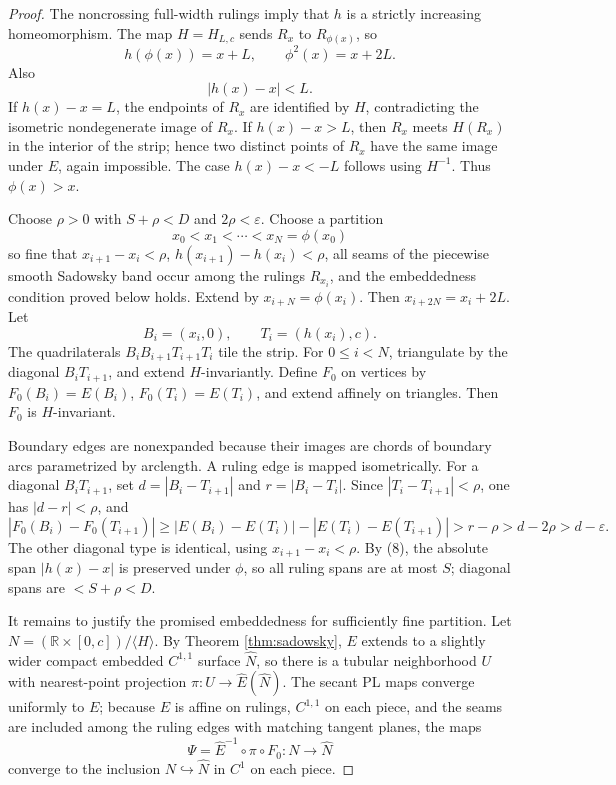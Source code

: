 \documentclass[12pt]{article}
\newcommand{\R}{\mathbb R}
\theoremstyle{plain}
\begin{document}
\begin{proof}
The noncrossing full-width rulings imply that \(h\) is a strictly increasing
homeomorphism.  The map \(H=H_{L,c}\) sends \(R_x\) to
\(R_{\phi(x)}\), so
\[
h(\phi(x))=x+L,\qquad \phi^2(x)=x+2L. \tag{8}
\]
Also
\[
|h(x)-x|<L. \tag{9}
\]
If \(h(x)-x=L\), the endpoints of \(R_x\) are identified by \(H\), contradicting
the isometric nondegenerate image of \(R_x\).  If \(h(x)-x>L\), then \(R_x\)
meets \(H(R_x)\) in the interior of the strip; hence two distinct points of
\(R_x\) have the same image under \(E\), again impossible.  The case
\(h(x)-x<-L\) follows using \(H^{-1}\).  Thus \(\phi(x)>x\).

Choose \(\rho>0\) with \(S+\rho<D\) and \(2\rho<\varepsilon\).  Choose a
partition
\[
x_0<x_1<\cdots<x_N=\phi(x_0)
\]
so fine that \(x_{i+1}-x_i<\rho\), \(h(x_{i+1})-h(x_i)<\rho\), all seams of the
piecewise smooth Sadowsky band occur among the rulings \(R_{x_i}\), and the
embeddedness condition proved below holds.  Extend by \(x_{i+N}=\phi(x_i)\).
Then \(x_{i+2N}=x_i+2L\).  Let
\[
B_i=(x_i,0),\qquad T_i=(h(x_i),c).
\]
The quadrilaterals \(B_iB_{i+1}T_{i+1}T_i\) tile the strip.  For
\(0\le i<N\), triangulate by the diagonal \(B_iT_{i+1}\), and extend
\(H\)-invariantly.  Define \(F_0\) on vertices by \(F_0(B_i)=E(B_i)\),
\(F_0(T_i)=E(T_i)\), and extend affinely on triangles.  Then \(F_0\) is
\(H\)-invariant.

Boundary edges are nonexpanded because their images are chords of boundary
arcs parametrized by arclength.  A ruling edge is mapped isometrically.  For a
diagonal \(B_iT_{i+1}\), set
\(d=|B_i-T_{i+1}|\) and \(r=|B_i-T_i|\).  Since
\(|T_i-T_{i+1}|<\rho\), one has \(|d-r|<\rho\), and
\[
|F_0(B_i)-F_0(T_{i+1})|
\ge |E(B_i)-E(T_i)|-|E(T_i)-E(T_{i+1})|
>r-\rho>d-2\rho>d-\varepsilon.
\]
The other diagonal type is identical, using \(x_{i+1}-x_i<\rho\).  By (8),
the absolute span \(|h(x)-x|\) is preserved under \(\phi\), so all ruling spans
are at most \(S\); diagonal spans are \(<S+\rho<D\).

It remains to justify the promised embeddedness for sufficiently fine
partition.  Let
\(N=(\R\times[0,c])/\langle H\rangle\).  By Theorem \ref{thm:sadowsky}, \(E\)
extends to a slightly wider compact embedded \(C^{1,1}\) surface
\(\widehat N\), so there is a tubular neighborhood \(U\) with nearest-point
projection \(\pi:U\to \widehat E(\widehat N)\).  The secant PL maps converge
uniformly to \(E\); because \(E\) is affine on rulings, \(C^{1,1}\) on each
piece, and the seams are included among the ruling edges with matching tangent
planes, the maps
\[
\Psi=\widehat E^{-1}\circ\pi\circ F_0:N\to\widehat N
\]
converge to the inclusion \(N\hookrightarrow\widehat N\) in \(C^1\) on each
piece.


\end{proof}
\end{document}
